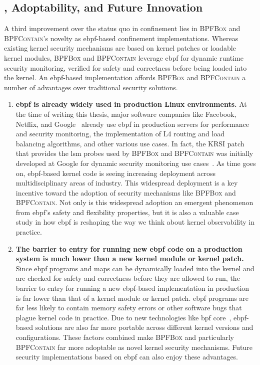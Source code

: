 \documentclass[
  fontsize=12pt,
  titlepage=firstiscover,
  paper=letter,
oneside,
  cleardoublepage=plain,
  parskip=half-,
  DIV=10,
  parindent,
  appendixprefix,
  chapterprefix,
  listof=totoc,
]{scrbook}
\newcommand{\bpfbox}{\textsc{BPFBox}}
\newcommand{\bpfcontain}{\textsc{BPFContain}}
\begin{document}
\subsection{, Adoptability, and Future Innovation}

A third improvement over the status quo in confinement lies in \bpfbox{} and
\bpfcontain{}'s novelty as \gls{ebpf}-based confinement implementations. Whereas existing
kernel security mechanisms are based on kernel patches or loadable kernel modules,
\bpfbox{} and \bpfcontain{} leverage \gls{ebpf} for dynamic runtime security monitoring,
verified for safety and correctness before being loaded into the kernel. An
\gls{ebpf}-based implementation affords \bpfbox{} and \bpfcontain{} a number of advantages
over traditional security solutions.

\begin{enumerate}
  \item \textbf{\gls{ebpf} is already widely used in production Linux environments.} At
  the time of writing this thesis, major software companies like Facebook, Netflix, and
  Google~\cite{gregg2019_bpf} already use \gls{ebpf} in production servers for performance
  and security monitoring, the implementation of L4 routing and load balancing algorithms,
  and other various use cases. In fact, the KRSI patch that provides the \gls{lsm} probes
  used by \bpfbox{} and \bpfcontain{} was initially developed at Google for dynamic
  security monitoring use cases~\cite{singh2019_krsi}. As time goes on, \gls{ebpf}-based
  kernel code is seeing increasing deployment across multidisciplinary areas of industry.
  This widespread deployment is a key incentive toward the adoption of security mechanisms
  like \bpfbox{} and \bpfcontain{}. Not only is this widespread adoption an emergent
  phenomenon from \gls{ebpf}'s safety and flexibility properties, but it is also
  a valuable case study in how \gls{ebpf} is reshaping the way we think about kernel
  observability in practice.

  \item \textbf{The barrier to entry for running new \gls{ebpf} code on a production
  system is much lower than a new kernel module or kernel patch.}
  Since \gls{ebpf} programs and maps can be dynamically loaded into the kernel and are
  checked for safety and correctness before they are allowed to run, the barrier to entry
  for running a new \gls{ebpf}-based implementation in production is far lower than that
  of a kernel module or kernel patch. \gls{ebpf} programs are far less likely to contain
  memory safety errors or other software bugs that plague kernel code in practice. Due to
  new technologies like \gls{bpf} \gls{core}~\cite{nakryiko2020_core}, \gls{ebpf}-based
  solutions are also far more portable across different kernel versions and
  configurations. These factors combined make \bpfbox{} and particularly \bpfcontain{} far
  more adoptable as novel kernel security mechanisms. Future security implementations
  based on \gls{ebpf} can also enjoy these advantages.


\end{enumerate}
\end{document}
